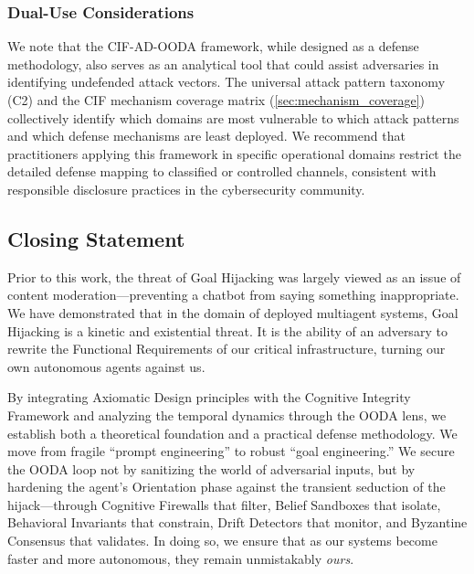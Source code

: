 \documentclass[
]{article}
\begin{document}
\subsubsection{Dual-Use Considerations}\label{dual-use-considerations}

We note that the CIF-AD-OODA framework, while designed as a defense
methodology, also serves as an analytical tool that could assist
adversaries in identifying undefended attack vectors. The universal
attack pattern taxonomy (C2) and the CIF mechanism coverage matrix
(\cref{sec:mechanism_coverage}) collectively identify which domains are
most vulnerable to which attack patterns and which defense mechanisms
are least deployed. We recommend that practitioners applying this
framework in specific operational domains restrict the detailed defense
mapping to classified or controlled channels, consistent with
responsible disclosure practices in the cybersecurity community.

\subsection{Closing Statement}\label{closing-statement}

Prior to this work, the threat of Goal Hijacking was largely viewed as
an issue of content moderation---preventing a chatbot from saying
something inappropriate. We have demonstrated that in the domain of
deployed multiagent systems, Goal Hijacking is a kinetic and existential
threat. It is the ability of an adversary to rewrite the Functional
Requirements of our critical infrastructure, turning our own autonomous
agents against us.

By integrating Axiomatic Design principles with the Cognitive Integrity
Framework and analyzing the temporal dynamics through the OODA lens, we
establish both a theoretical foundation and a practical defense
methodology. We move from fragile ``prompt engineering'' to robust
``goal engineering.'' We secure the OODA loop not by sanitizing the
world of adversarial inputs, but by hardening the agent's Orientation
phase against the transient seduction of the hijack---through Cognitive
Firewalls that filter, Belief Sandboxes that isolate, Behavioral
Invariants that constrain, Drift Detectors that monitor, and Byzantine
Consensus that validates. In doing so, we ensure that as our systems
become faster and more autonomous, they remain unmistakably \emph{ours}.

\newpage

\newpage
\end{document}
